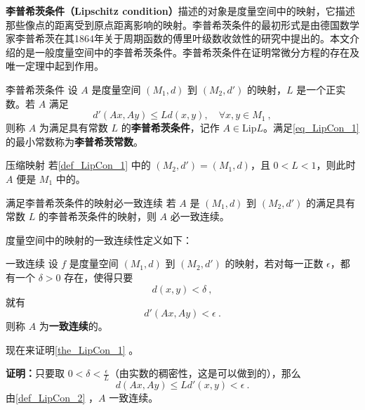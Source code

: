 
\textbf{李普希茨条件（Lipschitz condition）}描述的对象是度量空间中的映射，它描述那些像点的距离受到原点距离影响的映射。李普希茨条件的最初形式是由德国数学家李普希茨在其1864年关于周期函数的傅里叶级数收敛性的研究中提出的\cite{Li}。本文介绍的是一般度量空间中的李普希茨条件。李普希茨条件在证明常微分方程的存在及唯一定理中起到作用。
\begin{definition}{李普希茨条件}\label{def_LipCon_1}
设 $A$ 是度量空间 $(M_1,d)$ 到 $(M_2,d')$ 的映射，$L$ 是一个正实数。若 $A$ 满足
\begin{equation}\label{eq_LipCon_1}
d'(Ax,Ay)\leq Ld(x,y),\quad\forall x,y\in M_1~,
\end{equation}
则称 $A$ 为满足具有常数 $L$ 的\textbf{李普希茨条件}，记作 $A\in \mathrm{Lip} L$。满足\autoref{eq_LipCon_1} 的最小常数称为\textbf{李普希茨常数}。
\end{definition}
\begin{example}{压缩映射}
若\autoref{def_LipCon_1} 中的 $(M_2,d')=(M_1,d)$，且 $0<L<1$，则此时 $A$ 便是 $M_1$ 中的。
\end{example}

\begin{theorem}{满足李普希茨条件的映射必一致连续}\label{the_LipCon_1}
若 $A$ 是 $(M_1,d)$ 到 $(M_2,d')$ 的满足具有常数 $L$ 的李普希茨条件的映射，则 $A$ 必一致连续。
\end{theorem}
度量空间中的映射的一致连续性定义如下：
\begin{definition}{一致连续}\label{def_LipCon_2}
设 $f$ 是度量空间 $(M_1,d)$ 到 $(M_2,d')$ 的映射，若对每一正数 $\epsilon$，都有一个 $\delta>0$ 存在，使得只要
\begin{equation}
d(x,y)<\delta~,
\end{equation}
就有
\begin{equation}
d'(Ax,Ay)<\epsilon~.
\end{equation}
则称 $A$ 为\textbf{一致连续}的。

\end{definition}
现在来证明\autoref{the_LipCon_1} 。

\textbf{证明：}只要取 $0<\delta<\frac{\epsilon}{L}$（由实数的稠密性，这是可以做到的），那么
\begin{equation}
d(Ax,Ay)\leq Ld'(x,y)< \epsilon~.
\end{equation}
由\autoref{def_LipCon_2} ，$A$ 一致连续。

